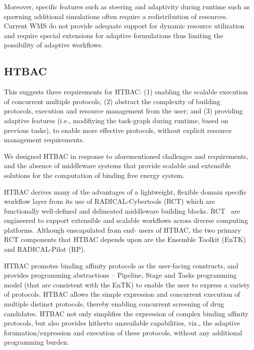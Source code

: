 Moreover, specific features such as steering and adaptivity during runtime
such as spawning additional simulations often require a redistribution of
resources. Current WMS do not provide adequate support for dynamic resource
utilization and require special extensions for adaptive formulations thus
limiting the possibility of adaptive workflows. 





\subsection{HTBAC}

This suggests three requirements for HTBAC\@: (1) enabling the scalable
execution of concurrent multiple protocols, (2) abstract the complexity of
building protocols, execution and resource management from the user; and (3)
providing adaptive features (i.e., modifiying the task-graph during runtime,
based on previous tasks), to enable more effective protocols, without explicit
resource management requirements.

We designed HTBAC in response to aforementioned challenges and requirements,
and the absence of middleware systems that provide scalable and extensible
solutions for the computation of binding free energy system.

HTBAC derives many of the advantages of a lightweight, flexible domain
specific workflow layer from its use of RADICAL-Cybertools (RCT) which are
functionally well-defined and delineated middleware building blocks.
RCT~\cite{review_bb_2016} are engineered to support extensible and scalable
workflows across diverse computing platforms. Although enscapulated from end-
users of HTBAC, the two primary RCT components that HTBAC depends upon are the
Ensemble Toolkit (EnTK) and RADICAL-Pilot (RP).

HTBAC promotes binding affinity protocols as the user-facing constructs, and
provides programming abstractions -- Pipeline, Stage and Tasks programming
model (that are consistent with the EnTK) to enable the user to express a
variety of protocols. HTBAC allows the simple expression and concurrent
execution of multiple distinct protocols, thereby enabling concurrent
screening of drug candidates. HTBAC not only simplifies the expression of
complex binding affinity protocols, but also provides hitherto unavailable
capabilities, viz., the adaptive forumation/expression and execution of these
protocols, without any additional programming burden.


